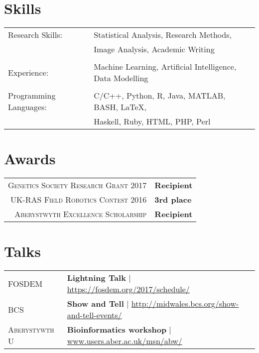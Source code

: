 \documentclass[a4paper,10pt]{article}
\begin{document}
\section{Skills}


\begin{tabular}{ll}


  Research Skills: & Statistical Analysis, Research Methods,\\& Image Analysis, Academic Writing

  \\

  \\

  Experience: & Machine Learning, Artificial Intelligence, Data Modelling

  \\

  \\


  Programming Languages: & C/C++, Python, R, Java, MATLAB, BASH, \LaTeX,\\& Haskell, Ruby, HTML, PHP, Perl


\end{tabular}


\section{Awards}
\begin{tabular}{rl}
  \textsc{Genetics Society Research Grant 2017}& \textbf{Recipient}
  \\
  \textsc{UK-RAS Field Robotics Contest 2016}& \textbf{3rd place}
  \\
  \textsc{Aberystwyth Excellence Scholarship}& \textbf{Recipient}
\end{tabular}


\section{Talks}
\begin{tabular}{ll}

  \textsc{FOSDEM} & \textbf{Lightning Talk} | \href{https://fosdem.org/2017/schedule/}{https://fosdem.org/2017/schedule/} \\
  \textsc{BCS} & \textbf{Show and Tell} | \href{http://www.midwales.bcs.org/show-and-tell-events/}{http://midwales.bcs.org/show-and-tell-events/}\\
  \textsc{Aberystywth U} & \textbf{Bioinformatics workshop} | \href{www.users.aber.ac.uk/msn/abw/index.html}{www.users.aber.ac.uk/msn/abw/}

\end{tabular}
\end{document}
